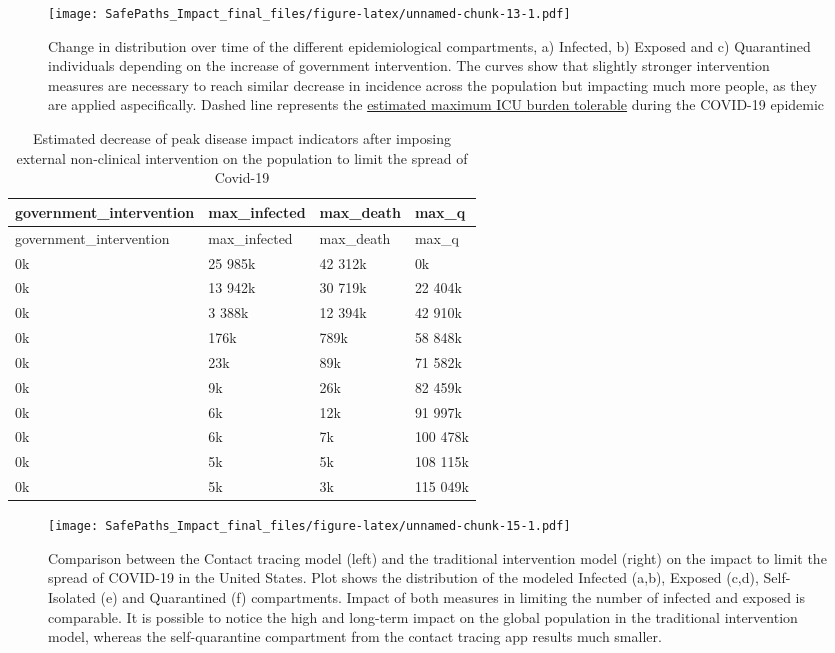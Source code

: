 \documentclass[]{article}
\begin{document}
\begin{figure}
\centering
\texttt{[image: SafePaths\_Impact\_final\_files/figure-latex/unnamed-chunk-13-1.pdf]}
\caption{Change in distribution over time of the different
epidemiological compartments, a) Infected, b) Exposed and c) Quarantined
individuals depending on the increase of government intervention. The
curves show that slightly stronger intervention measures are necessary
to reach similar decrease in incidence across the population but
impacting much more people, as they are applied aspecifically. Dashed
line represents the
\href{https://www.statnews.com/2020/03/10/simple-math-alarming-answers-covid-19/}{estimated
maximum ICU burden tolerable} during the COVID-19 epidemic}
\end{figure}

\begin{longtable}[]{@{}llll@{}}
\caption{Estimated decrease of peak disease impact indicators after
imposing external non-clinical intervention on the population to limit
the spread of Covid-19}\tabularnewline
\toprule
government\_intervention & max\_infected & max\_death &
max\_q\tabularnewline
\midrule
\endfirsthead
\toprule
government\_intervention & max\_infected & max\_death &
max\_q\tabularnewline
\midrule
\endhead
0k & 25 985k & 42 312k & 0k\tabularnewline
0k & 13 942k & 30 719k & 22 404k\tabularnewline
0k & 3 388k & 12 394k & 42 910k\tabularnewline
0k & 176k & 789k & 58 848k\tabularnewline
0k & 23k & 89k & 71 582k\tabularnewline
0k & 9k & 26k & 82 459k\tabularnewline
0k & 6k & 12k & 91 997k\tabularnewline
0k & 6k & 7k & 100 478k\tabularnewline
0k & 5k & 5k & 108 115k\tabularnewline
0k & 5k & 3k & 115 049k\tabularnewline
\bottomrule
\end{longtable}

\begin{figure}
\centering
\texttt{[image: SafePaths\_Impact\_final\_files/figure-latex/unnamed-chunk-15-1.pdf]}
\caption{Comparison between the Contact tracing model (left) and the
traditional intervention model (right) on the impact to limit the spread
of COVID-19 in the United States. Plot shows the distribution of the
modeled Infected (a,b), Exposed (c,d), Self-Isolated (e) and Quarantined
(f) compartments. Impact of both measures in limiting the number of
infected and exposed is comparable. It is possible to notice the high
and long-term impact on the global population in the traditional
intervention model, whereas the self-quarantine compartment from the
contact tracing app results much smaller.}
\end{figure}
\end{document}

